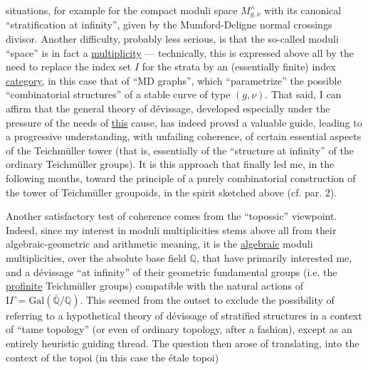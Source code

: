
situations, for example for the compact moduli space
$M^{\wedge}_{g,\nu}$ with its canonical ``stratification at infinity'', given
by the Mumford-Deligne normal crossings divisor. Another
difficulty, probably less serious, is that the so-called
moduli ``space'' is in fact a \uline{multiplicity} --- technically,
this is expressed above all by the need to replace
the index set $I$ for the strata by an (essentially finite)
index \uline{category}, in this case that of
``MD graphs'', which ``parametrize'' the possible ``combinatorial structures''
of a stable curve of type $(g,\nu)$. That said, I can
affirm that the general theory of dévissage, developed especially
under the pressure of the needs of \uline{this} cause, has indeed proved
a valuable guide, leading to a progressive understanding,
with unfailing coherence, of certain essential aspects
of the Teichmüller tower (that is, essentially
of the ``structure at infinity'' of the ordinary Teichmüller groups).
It is this approach that finally led me, in the following
months, toward the principle of a purely combinatorial
construction of the tower of Teichmüller groupoids, in the spirit
sketched above (cf. par. 2).

Another satisfactory test of coherence comes from the
``topossic'' viewpoint. Indeed, since my interest in moduli
multiplicities stems above all from their  algebraic-geometric
and arithmetic meaning, it is the \uline{algebraic} moduli
multiplicities, over the absolute base field $\mathbb{Q}$, that have
primarily interested me, and a dévissage ``at infinity'' of their
geometric fundamental groups (i.e. the \uline{profinite} Teichmüller
groups) compatible with the natural actions of
$\mathrm{I}\!\Gamma = \mathrm{Gal}(\bar{\mathbb{Q}}/\mathbb{Q})$. This seemed from the outset to exclude the possibility of
referring to a hypothetical theory of dévissage of stratified
structures in a context of ``tame topology'' (or even of
ordinary topology, after a fashion), except as an
entirely heuristic guiding thread. The question then arose of translating,
into the context of the topoi (in this case the étale topoi)


